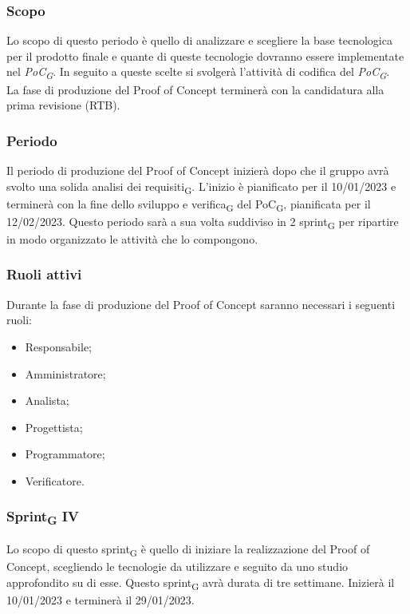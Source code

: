 \subsubsection{Scopo}
Lo scopo di questo periodo è quello di analizzare e scegliere la base tecnologica per il prodotto finale e quante di queste tecnologie dovranno essere implementate nel \textit{PoC\textsubscript{G}}. In seguito a queste scelte si svolgerà l’attività di codifica del \textit{PoC\textsubscript{G}}.\\
La fase di produzione del Proof of Concept terminerà con la candidatura alla prima revisione (RTB).
\subsubsection{Periodo}
Il periodo di produzione del Proof of Concept inizierà dopo che il gruppo avrà svolto una solida analisi dei requisiti\textsubscript{G}. L'inizio è pianificato per il 10/01/2023 e terminerà con la fine dello sviluppo e verifica\textsubscript{G} del PoC\textsubscript{G}, pianificata per il 12/02/2023. Questo periodo sarà a sua volta suddiviso in 2 sprint\textsubscript{G} per ripartire in modo organizzato le attività che lo compongono.

\subsubsection{Ruoli attivi}
Durante la fase di produzione del Proof of Concept saranno necessari i seguenti ruoli:
\begin{itemize}
	\item Responsabile;
    \item Amministratore;
    \item Analista;
    \item Progettista;
    \item Programmatore;
    \item Verificatore.
\end{itemize}

\subsubsection{Sprint\textsubscript{G} IV}
Lo scopo di questo sprint\textsubscript{G} è quello di iniziare la realizzazione del Proof of Concept, scegliendo le tecnologie da utilizzare e seguito da uno studio approfondito su di esse.
Questo sprint\textsubscript{G} avrà durata di tre settimane. Inizierà il 10/01/2023 e terminerà il 29/01/2023.

